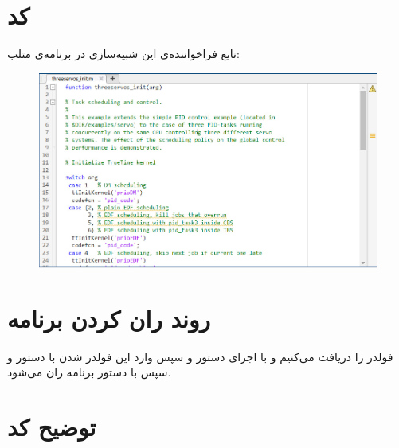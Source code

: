 \newpage

\section*{کد }

تابع فراخواننده‌ی این شبیه‌سازی در برنامه‌ی متلب:

\begin{figure}[H]
	\centering
	\includegraphics{16.jpg}
	\label{fig:label4}
\end{figure}

\newpage

\section*{روند ران کردن برنامه}

فولدر
را دریافت می‌کنیم و با اجرای دستور
و سپس وارد این فولدر شدن با دستور
و سپس با دستور
برنامه ران می‌شود.

\section*{توضیح کد}


